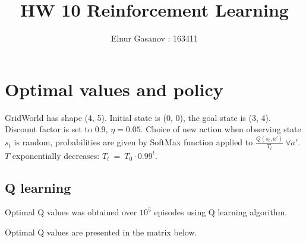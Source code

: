 \documentclass{article}
\author{Elnur Gasanov : 163411}
\title{HW 10 Reinforcement Learning}
\begin{document}
\maketitle
\section{Optimal values and policy}

GridWorld has shape (4, 5). Initial state is (0, 0), the goal state is (3, 4). Discount factor is set to 0.9, $\eta = 0.05$. Choice of new action when observing state $s_t$ is random, probabilities are given by SoftMax function applied to  $\frac{Q(s_t, a')}{T_t} \ \forall a'$.  $T$ exponentially decreases: $T_t~=~T_0 \cdot 0.99^t$.

\subsection{Q learning}

Optimal Q values was obtained over $10^5$ episodes using Q learning algorithm.

Optimal Q values are presented in the matrix below.
\end{document}
